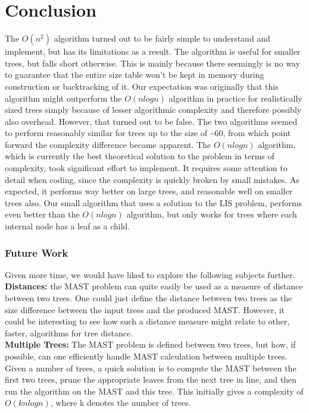 \chapter{Conclusion}
\label{ch:conclusion}
The $O(n^2)$ algorithm turned out to be fairly simple to understand and implement, but has its limitations as a result. The algorithm is useful for smaller trees, but falls short otherwise. This is mainly because there seemingly is no way to guarantee that the entire size table won't be kept in memory during construction or backtracking of it. Our expectation was originally that this algorithm might outperform the $O(nlogn)$ algorithm in practice for realistically sized trees simply because of lesser algorithmic complexity and therefore possibly also overhead. However, that turned out to be false. The two algorithms seemed to perform reasonably similar for trees up to the size of \textasciitilde 60, from which point forward the complexity difference became apparent.
The $O(nlogn)$ algorithm, which is currently the best theoretical solution to the problem in terms of complexity, took significant effort to implement. It requires some attention to detail when coding, since the complexity is quickly broken by small mistakes. As expected, it performs way better on large trees, and reasonable well on smaller trees also. Our small algorithm that uses a solution to the LIS problem, performs even better than the $O(nlogn)$ algorithm, but only works for trees where each internal node has a leaf as a child.

\subsection{Future Work}
Given more time, we would have liked to explore the following subjects further.\\

\noindent\textbf{Distances:} the MAST problem can quite easily be used as a measure of distance between two trees. One could just define the distance between two trees as the size difference between the input trees and the produced MAST. However, it could be interesting to see how such a distance measure might relate to other, faster, algorithms for tree distance. \\ 

\noindent\textbf{Multiple Trees:} The MAST problem is defined between two trees, but how, if possible, can one efficiently handle MAST calculation between multiple trees. Given a number of trees, a quick solution is to compute the MAST between the first two trees, prune the appropriate leaves from the next tree in line, and then run the algorithm on the MAST and this tree. This initially gives a complexity of $O(knlogn)$, where k denotes the number of trees. \\   

